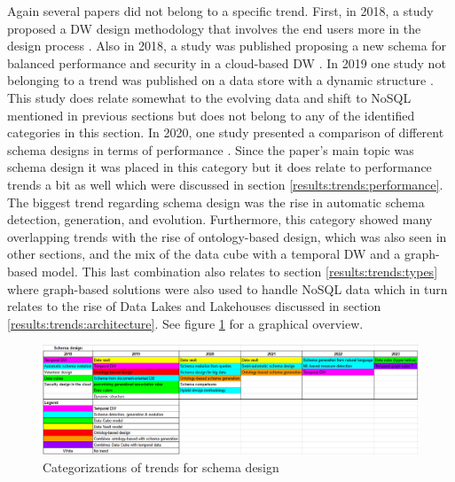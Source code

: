\documentclass[11pt]{article}
\begin{document}
Again several papers did not belong to a specific trend. First, in 2018, a study proposed a DW design methodology that involves the end users more in the design process \cite{Sakka2018286}. Also in 2018, a study was published proposing a new schema for balanced performance and security in a cloud-based DW \cite{Karkouda20186}. In 2019 one study not belonging to a trend was published on a data store with a dynamic structure \cite{Artamonov2019794}. This study does relate somewhat to the evolving data and shift to NoSQL mentioned in previous sections but does not belong to any of the identified categories in this section. In 2020, one study presented a comparison of different schema designs in terms of performance \cite{Rocha202085}. Since the paper's main topic was schema design it was placed in this category but it does relate to performance trends a bit as well which were discussed in section \ref{results:trends:performance}. \\

The biggest trend regarding schema design was the rise in automatic schema detection, generation, and evolution. Furthermore, this category showed many overlapping trends with the rise of ontology-based design, which was also seen in other sections, and the mix of the data cube with a temporal DW and a graph-based model. This last combination also relates to section \ref{results:trends:types} where graph-based solutions were also used to handle NoSQL data which in turn relates to the rise of Data Lakes and Lakehouses discussed in section \ref{results:trends:architecture}. See figure \ref{fig:schema} for a graphical overview. \\

\begin{figure}
\centering
\includegraphics[scale=0.5]{Images/schema design.png}
\caption{Categorizations of trends for schema design}
\label{fig:schema}
\end{figure}
\end{document}
